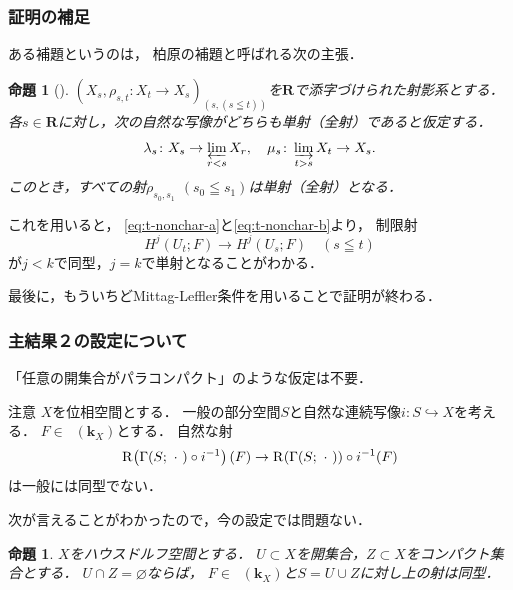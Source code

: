 \documentclass[dvipdfmx,10pt,aspectratio=169,leqno]{beamer}%
\newcommand{\rr}{\mathbf{R}}
\newcommand{\kk}{\mathbf{k}}
\numberwithin{equation}{subsection}
\newcommand{\Dompl}{\mathop{\mathsf{D}^\mathrm{+}}\nolimits}
\newcommand{\Rder}[1][]{\mathop{\mathrm{R}^{#1}\hspace{-2pt}}\nolimits}
\newcommand{\indlim}[1][]{\mathop{\varinjlim}\limits_{#1}}
\newcommand{\prolim}[1][]{\mathop{\varprojlim}\limits_{#1}}
\newcommand{\blk}{\mathord{\ \cdot\ }}
\theoremstyle{mystyle}
\newtheorem{PRP}[AXM]{命題}
\begin{document}
\begin{frame}
  \frametitle{証明の補足}

  ある補題\cite[Proposition 1.12.6]{KS90}というのは，
  柏原の補題と呼ばれる次の主張．
  \begin{PRP}[{\cite[Proposition 1.12.6]{KS90}}]
    \(
      \left(X_s,\rho_{s,t}\colon X_t\to X_s\right)_{(s,(s\leqq t))}
    \)を\(\rr\)で添字づけられた射影系とする．
    各\(s\in\rr\)に対し，次の自然な写像がどちらも単射（全射）であると仮定する．
    \[
      \lambda_s\colon X_s\to\prolim[r<s]X_r
      ,\quad
      \mu_s\colon \indlim[t>s]X_t\to X_s.
    \]
    このとき，すべての射\(
      \rho_{s_{0},s_{1}}\) \((s_0\leqq s_1)
    \)は単射（全射）となる．
  \end{PRP}
  これを用いると，
  \ref{eq:t-nonchar-a}と\ref{eq:t-nonchar-b}より，
  制限射
  \[
    H^{j}\left(U_{t};F\right)
    \to
    H^{j}\left(U_{s};F\right)\quad  (s\leqq t)
  \]
  が\(j<k\)で同型，\(j=k\)で単射となることがわかる．

  最後に，もういちどMittag-Leffler条件を用いることで証明が終わる．
\end{frame}


\begin{frame}
  \frametitle{主結果２の設定について}
  「任意の開集合がパラコンパクト」のような仮定は不要．

  \begin{alertblock}{注意}
    \(X\)を位相空間とする．
    一般の部分空間\(S\)と自然な連続写像\(
      i\colon S\hookrightarrow X
    \)を考える．
    \(F\in\Dompl(\kk_{X})\)とする．
    自然な射\[
      \Rder[]\left(\Gamma(S;\blk)\circ i^{-1}\right)(F)
      \to
      \Rder[]{(\Gamma(S;\blk))}\circ i^{-1}(F)
    \]は一般には同型でない．    
  \end{alertblock}
  次が言えることがわかったので，今の設定では問題ない．
  \begin{PRP}
    \(X\)をハウスドルフ空間とする．
    \(U\subset X\)を開集合，\(Z\subset X\)をコンパクト集合とする．
    \(U\cap Z=\varnothing\)ならば，
    \(F\in\Dompl(\kk_{X})\)と\(S=U\cup Z\)に対し上の射は同型．
  \end{PRP}
\end{frame}
\end{document}

